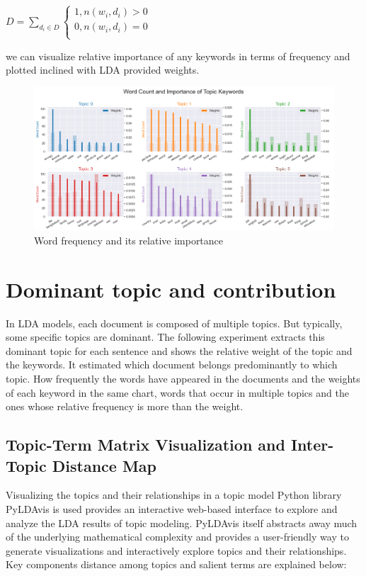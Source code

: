 \documentclass[sn-mathphys,Numbered]{sn-jnl}%
\theoremstyle{thmstyleone}%
\theoremstyle{thmstyletwo}%
\theoremstyle{thmstylethree}%
\begin{document}
\(D = \sum_{d_{i} \in D}^{}\left\{ \begin{matrix}
1,n\left( w_{i},d_{i} \right) > 0 \\
0,n\left( w_{i},d_{i} \right) = 0 \\
\end{matrix} \right.\ \)

we can visualize relative importance of any keywords in terms of frequency and plotted inclined with LDA provided weights.

\begin{figure}[h]
\centerline{\includegraphics[width=\textwidth]{relative_imp.png}}
\caption{Word frequency and its relative importance}
\label{fig:Relative_weight}
\end{figure}

\section{Dominant topic and contribution}

In LDA models, each document is composed of multiple topics. But
typically, some specific topics are dominant. The following experiment
extracts this dominant topic for each sentence and shows the relative
weight of the topic and the keywords. It estimated which document
belongs predominantly to which topic. How frequently the words have
appeared in the documents and the weights of each keyword in the same
chart, words that occur in multiple topics and the ones whose relative
frequency is more than the weight.

\subsection{Topic-Term Matrix Visualization and Inter-Topic Distance Map}

Visualizing the topics and their relationships in a topic model Python
library PyLDAvis is used provides an interactive web-based interface to
explore and analyze the LDA results of topic modeling. PyLDAvis itself
abstracts away much of the underlying mathematical complexity and
provides a user-friendly way to generate visualizations and
interactively explore topics and their relationships. Key components
distance among topics and salient terms are explained below:
\end{document}
